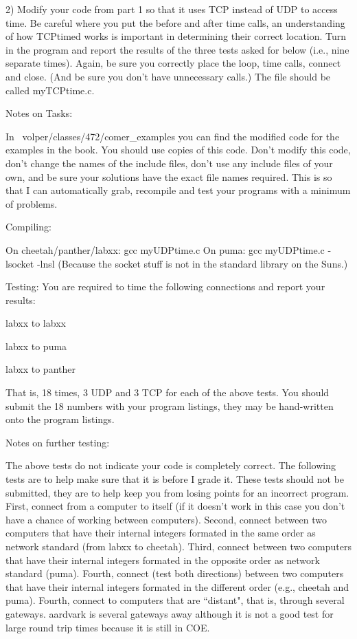 2) Modify your code from part 1 so that it uses TCP instead of UDP to access 
time.
Be careful where you put the before and after time calls, an understanding
of how TCPtimed works is important in determining their correct location.
Turn in the program and report the results of the three tests asked for 
below (i.e., nine separate times).
Again, be sure you correctly place the
loop, time calls, connect and close.
(And be sure you don't have unnecessary calls.)
The file should be called {\ltt{}myTCPtime.c}.

Notes on Tasks:

In {\ltt{}~volper/classes/472/comer_examples} you can find the modified code 
for the examples in the book. You should use copies of this code.
Don't modify this code, don't change the names of the include files,
don't use any include files of your own,
and be sure your solutions have the exact file names required.
This is so that I can automatically grab, recompile and test your programs
with a minimum of problems.

Compiling:

On {\ltt{}cheetah}/{\ltt{}panther}/{\ltt{}labxx}: {\ltt{}gcc myUDPtime.c}
\hfill\break
On {\ltt{}puma}: {\ltt{}gcc myUDPtime.c -lsocket -lnsl}
\hfill\break
(Because the socket stuff is not in the standard library on the Suns.)

Testing:
You are required to time the following connections and report your results:

{\ltt{}labxx} to {\ltt{}labxx}

{\ltt{}labxx} to {\ltt{}puma}

{\ltt{}labxx} to {\ltt{}panther}

That is, 18 times, 3 UDP and 3 TCP for each of the above tests.
You should submit the 18 numbers with your program listings,
they may be hand-written onto the program listings.
\bye

\vfill\eject
Notes on further testing:

The above tests do not indicate your code is completely correct.
The following tests are to help make sure that it is before I grade it.
These tests should not be submitted, they are to help keep you from losing
points for an incorrect program.
\hfill\break
First, connect from a computer to itself (if it doesn't work in this case
you don't have a chance of working between computers).
\hfill\break
Second, connect between two computers that have their internal integers 
formated in the same order as network standard (from {\ltt{}labxx} to
{\ltt{}cheetah}).
\hfill\break
Third, connect between two computers that have their internal integers 
formated in the opposite order as network standard ({\ltt{}puma}).
\hfill\break
Fourth, connect (test both directions) between two computers that have their 
internal integers formated in the different order (e.g., {\ltt{}cheetah} and
{\ltt{}puma}).
\hfill\break
Fourth, connect to computers that are ``distant", that is, through
several gateways.
{\ltt{}aardvark} is several gateways away although it is not
a good test for large round trip times because it is still in COE.


